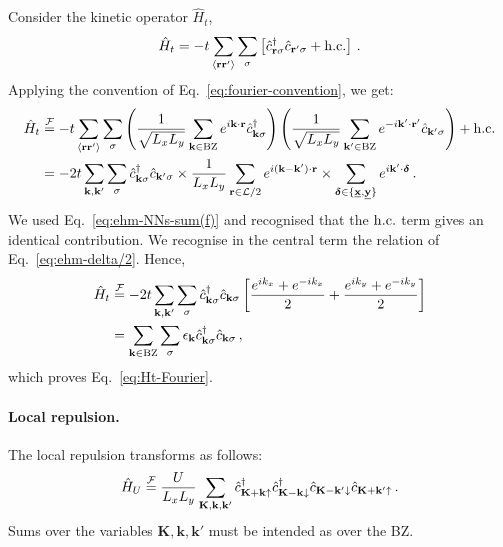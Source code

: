 \begin{tabproof}
	
	Consider the kinetic operator $\hat H_t$,
	\[
		\hat H_t = -t \sum_{\langle \mathbf{r}\mathbf{r}' \rangle} \sum_\sigma \left[
		\hat c_{\mathbf{r}\sigma}^\dagger \hat c_{\mathbf{r}'\sigma} + \mathrm{h.c.}
		\right] \, .
	\]
	Applying the convention of Eq.~\eqref{eq:fourier-convention}, we get:
	\[
	\begin{aligned}
		\hat H_t &\stackrel{\mathcal{F}}{=} -t \sum_{\langle \mathbf{r}\mathbf{r}' \rangle} \sum_\sigma \left(\frac{1}{\sqrt{L_xL_y}} \sum_{\mathbf{k}\in\mathrm{BZ}} e^{i\mathbf{k}\cdot\mathbf{r}} \hat c_{\mathbf{k}\sigma}^\dagger\right) \left(\frac{1}{\sqrt{L_xL_y}} \sum_{\mathbf{k}'\in\mathrm{BZ}} e^{-i\mathbf{k}'\cdot\mathbf{r}'} \hat c_{\mathbf{k}'\sigma} \right)+ \mathrm{h.c.} \\
		&= -2t\sum_{\mathbf{k},\mathbf{k}'} \sum_\sigma \hat c_{\mathbf{k}\sigma}^\dagger \hat c_{\mathbf{k}'\sigma} \times \frac{1}{L_x L_y} \sum_{\mathbf{r}\in\mathcal{L}/2} e^{i(\mathbf{k}-\mathbf{k}')\cdot\mathbf{r}} \times \sum_{\bm{\delta} \in \lbrace \underline{\mathbf{x}}, \underline{\mathbf{y}} \rbrace} e^{i \mathbf{k}' \cdot \bm{\delta}} \, .
	\end{aligned}
	\]
	We used Eq.~\eqref{eq:ehm-NNs-sum(f)} and recognised that the $\mathrm{h.c.}$ term gives an identical contribution. We recognise in the central term the relation of Eq.~\eqref{eq:ehm-delta/2}. Hence,
	\[
	\begin{aligned}
		\hat H_t &\stackrel{\mathcal{F}}{=} -2t\sum_{\mathbf{k},\mathbf{k}'} \sum_\sigma \hat c_{\mathbf{k}\sigma}^\dagger \hat c_{\mathbf{k}\sigma} \left[
			\frac{e^{i k_x}+e^{-i k_x}}{2} + \frac{e^{i k_y}+e^{-i k_y}}{2}
		\right] \\
		&= \sum_{\mathbf{k} \in \mathrm{BZ}} \sum_\sigma \epsilon_\mathbf{k} \hat c_{\mathbf{k}\sigma}^\dagger \hat c_{\mathbf{k}\sigma} \, ,
	\end{aligned}
	\]
	which proves Eq.~\eqref{eq:Ht-Fourier}.

\end{tabproof}

\paragraph{Local repulsion.}

The local repulsion transforms as follows:
\begin{equation}\label{eq:HU-fourier}
	\hat H_U \stackrel{\mathcal{F}}{=} \frac{U}{L_x L_y}
	\sum_{\mathbf{K}, \mathbf{k}, \mathbf{k}'} \hat c_{\mathbf{K}+\mathbf{k} \uparrow}^\dagger \hat c_{\mathbf{K}-\mathbf{k} \downarrow}^\dagger \hat c_{\mathbf{K}-\mathbf{k}' \downarrow} \hat c_{\mathbf{K}+\mathbf{k}' \uparrow} \, .
\end{equation}
Sums over the variables $\mathbf{K}, \mathbf{k}, \mathbf{k}'$ must be intended as over the BZ.

